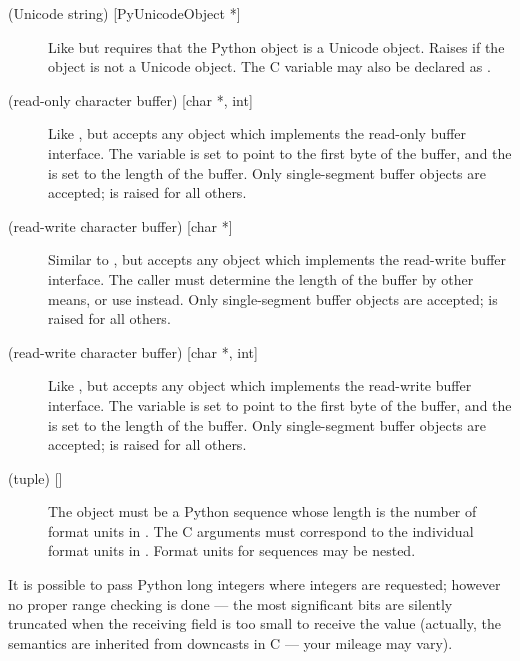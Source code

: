 \begin{description}
  \item[ (Unicode string) {[PyUnicodeObject *]}]
  Like  but requires that the Python object is a Unicode
  object.  Raises  if the object is not a Unicode
  object.  The C variable may also be declared as .

  \item[ (read-only character buffer) {[char *, int]}]
  Like , but accepts any object which implements the
  read-only buffer interface.  The  variable is set to
  point to the first byte of the buffer, and the  is set to
  the length of the buffer.  Only single-segment buffer objects are
  accepted;  is raised for all others.

  \item[ (read-write character buffer) {[char *]}]
  Similar to , but accepts any object which implements the
  read-write buffer interface.  The caller must determine the length
  of the buffer by other means, or use  instead.  Only
  single-segment buffer objects are accepted;  is
  raised for all others.

  \item[ (read-write character buffer) {[char *, int]}]
  Like , but accepts any object which implements the
  read-write buffer interface.  The  variable is set to
  point to the first byte of the buffer, and the  is set to
  the length of the buffer.  Only single-segment buffer objects are
  accepted;  is raised for all others.

  \item[ (tuple) {[]}]
  The object must be a Python sequence whose length is the number of
  format units in .  The C arguments must correspond to the
  individual format units in .  Format units for sequences
  may be nested.

\end{description}

It is possible to pass Python long integers where integers are
requested; however no proper range checking is done --- the most
significant bits are silently truncated when the receiving field is
too small to receive the value (actually, the semantics are inherited
from downcasts in C --- your mileage may vary).

